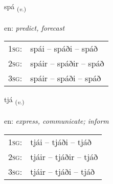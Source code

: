 \documentclass[frontgrid, backgrid]{flacards}\usepackage[]{graphicx}\usepackage[]{color}
\begin{document}
\renewcommand{\flhead}{\vskip5pt \fboxsep=0pt {\small\bfseries\footnotesize Sagnorð | Verb}}
\renewcommand{\fcfoot}{\vskip5pt \fboxsep=0pt \hspace{2pt}{\small\bfseries\footnotesize 2K}}

\renewcommand{\blhead}{\vskip5pt {\small\bfseries\footnotesize Sagnorð | Verb }}
\renewcommand{\bcfoot}{\vskip5pt \hspace{2pt}{\small\bfseries\footnotesize 2K}}


{spá \small{\textsubscript{(\textit{v.})}} \\[1ex] %
\textphonetic{[spauː]} \\
en: \emph{predict, forecast} \\  [2ex]
\renewcommand*{\arraystretch}{0.8}
\begin{tabular}{p{1cm}l}
\textsc{1sg}: & spái -- spáði -- spáð \\ 
\textsc{2sg}: & spáir -- spáðir -- spáð \\ 
\textsc{3sg}: & spáir -- spáði -- spáð \\ 
\end{tabular}
}

\renewcommand{\flhead}{\vskip5pt \fboxsep=0pt {\small\bfseries\footnotesize Sagnorð | Verb}}
\renewcommand{\fcfoot}{\vskip5pt \fboxsep=0pt \hspace{2pt}{\small\bfseries\footnotesize 2K}}

\renewcommand{\blhead}{\vskip5pt {\small\bfseries\footnotesize Sagnorð | Verb }}
\renewcommand{\bcfoot}{\vskip5pt \hspace{2pt}{\small\bfseries\footnotesize 2K}}


{tjá \small{\textsubscript{(\textit{v.})}} \\[1ex] %
\textphonetic{[tʰjauː]} \\
en: \emph{express, communicate; inform} \\  [2ex]
\renewcommand*{\arraystretch}{0.8}
\begin{tabular}{p{1cm}l}
\textsc{1sg}: & tjái -- tjáði -- tjáð \\ 
\textsc{2sg}: & tjáir -- tjáðir -- tjáð \\ 
\textsc{3sg}: & tjáir -- tjáði -- tjáð \\ 
\end{tabular}
}
\end{document}
